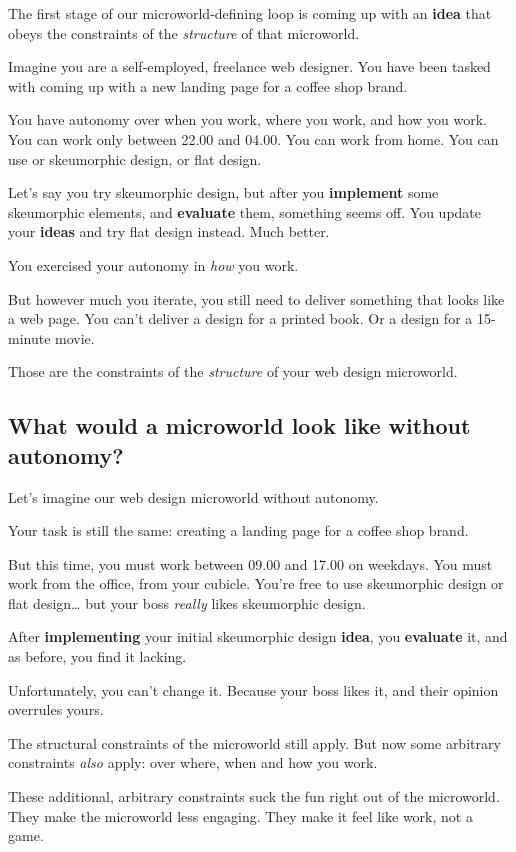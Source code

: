 The first stage of our microworld-defining loop is coming up with an
\textbf{idea} that obeys the constraints of the \emph{structure} of that
microworld.

Imagine you are a self-employed, freelance web designer. You have been
tasked with coming up with a new landing page for a coffee shop brand.

You have autonomy over when you work, where you work, and how you work.
You can work only between 22.00 and 04.00. You can work from home. You
can use or skeumorphic design, or flat design.

Let's say you try skeumorphic design, but after you \textbf{implement}
some skeumorphic elements, and \textbf{evaluate} them, something seems
off. You update your \textbf{ideas} and try flat design instead. Much
better.

You exercised your autonomy in \emph{how} you work.

But however much you iterate, you still need to deliver something that
looks like a web page. You can't deliver a design for a printed book. Or
a design for a 15-minute movie.

Those are the constraints of the \emph{structure} of your web design
microworld.

\subsection{What would a microworld look like without autonomy?}

Let's imagine our web design microworld without autonomy.

Your task is still the same: creating a landing page for a coffee shop
brand.

But this time, you must work between 09.00 and 17.00 on weekdays. You
must work from the office, from your cubicle. You're free to use
skeumorphic design or flat design\ldots{} but your boss \emph{really}
likes skeumorphic design.

After \textbf{implementing} your initial skeumorphic design
\textbf{idea}, you \textbf{evaluate} it, and as before, you find it
lacking.

Unfortunately, you can't change it. Because your boss likes it, and
their opinion overrules yours.

The structural constraints of the microworld still apply. But now some
arbitrary constraints \emph{also} apply: over where, when and how you
work.

These additional, arbitrary constraints suck the fun right out of the
microworld. They make the microworld less engaging. They make it feel
like work, not a game.

